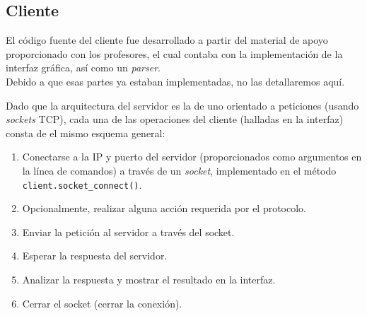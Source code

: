\subsection{Cliente}

El código fuente del cliente fue desarrollado a partir del material de apoyo proporcionado con los profesores, el cual contaba con la implementación de la interfaz gráfica, así como un \textit{parser}.\\
Debido a que esas partes ya estaban implementadas, no las detallaremos aquí.\newline

Dado que la arquitectura del servidor es la de uno orientado a peticiones (usando \textit{sockets} TCP), cada una de las operaciones del cliente (halladas en la interfaz) consta de el mismo esquema general:
\begin{enumerate}
    \item Conectarse a la IP y puerto del servidor (proporcionados como argumentos en la línea de comandos) a través de un \textit{socket}, implementado en el método\\
    \texttt{client.socket\_connect()}.
    \item Opcionalmente, realizar alguna acción requerida por el protocolo.
    \item Enviar la petición al servidor a través del socket.
    \item Esperar la respuesta del servidor.
    \item Analizar la respuesta y mostrar el resultado en la interfaz.
    \item Cerrar el socket (cerrar la conexión).
\end{enumerate}

